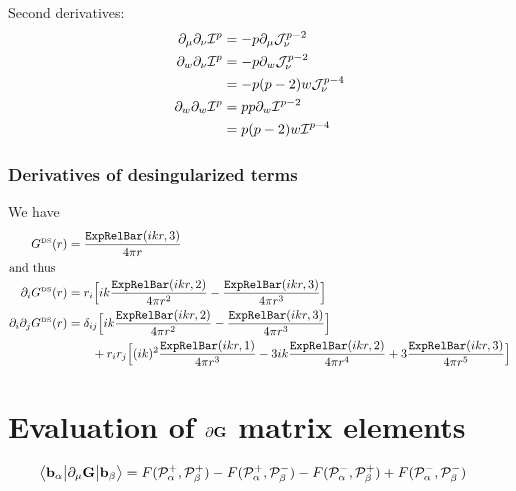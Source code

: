 \documentclass[letterpaper]{article}
\begin{document}
Second derivatives:
\begin{align*}
 \partial_\mu \partial_\nu \mathcal{I}^p
&=-p\partial_\mu \mathcal{J}_{\nu}^{p-2}
\\
 \partial_w \partial_\nu \mathcal{I}^p
&=-p\partial_w \mathcal{J}_\nu^{p-2}
\\
&=-p(p-2)w \mathcal{J}_\nu^{p-4}
\\
 \partial_w \partial_w \mathcal{I}^p
&=pp\partial_w \mathcal{I}^{p-2}
\\
&=p(p-2)w \mathcal{I}^{p-4}
\end{align*}

\subsubsection{Derivatives of desingularized terms}

We have
\begin{align*}
 G^{\hbox{\tiny{DS}}}(r) &= \frac{\texttt{ExpRelBar}(ikr,3)}{4\pi r}
\\
\intertext{and thus}
\partial_i 
 G^{\hbox{\tiny{DS}}}(r) &= 
       r_i  \Big[ ik\frac{\texttt{ExpRelBar}(ikr,2)}{4\pi r^2}
                   -\frac{\texttt{ExpRelBar}(ikr,3)}{4\pi r^3}
            \Big]
\\
\partial_i \partial_j
 G^{\hbox{\tiny{DS}}}(r) &= 
  \delta_{ij} \Big[ ik \frac{\texttt{ExpRelBar}(ikr,2)}{4\pi r^2}
                   -\frac{\texttt{ExpRelBar}(ikr,3)}{4\pi r^3}
              \Big]
\\
&\qquad 
 +r_i r_j   \Big[ (ik)^2 \frac{\texttt{ExpRelBar}(ikr,1)}{4\pi r^3}
                  -3ik\frac{\texttt{ExpRelBar}(ikr,2)}{4\pi r^4}
                  +3\frac{\texttt{ExpRelBar}(ikr,3)}{4\pi r^5}
            \Big]
\end{align*}

\newpage
\section{Evaluation of $\partial \mathbf{G}$ matrix elements}

\begin{align*}
 \big\langle \mathbf{b}_\alpha \big| \partial_\mu \mathbf{G} \big| \mathbf{b}_\beta \big\rangle
&=  F(\mathcal{P}_\alpha^+, \mathcal{P}_\beta^+)
   -F(\mathcal{P}_\alpha^+, \mathcal{P}_\beta^-)
   -F(\mathcal{P}_\alpha^-, \mathcal{P}_\beta^+)
   +F(\mathcal{P}_\alpha^-, \mathcal{P}_\beta^-)
\end{align*}
\end{document}
